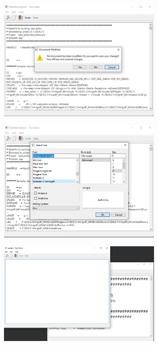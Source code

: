 \includegraphics[width=0.6\textwidth]{scr3.PNG}

\includegraphics[width=0.6\textwidth]{scr4.PNG}

\includegraphics[width=0.6\textwidth]{scr5.PNG}